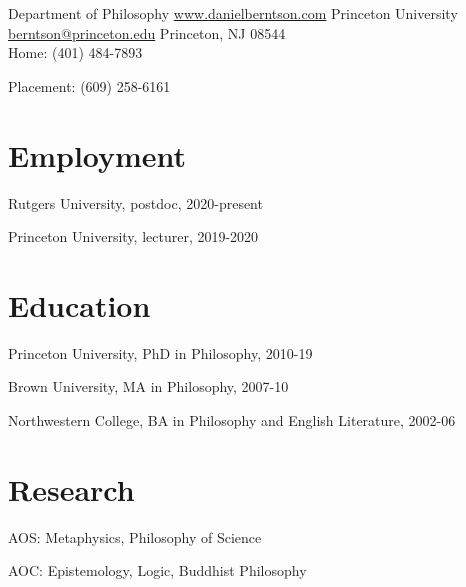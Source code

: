 \documentclass{cv_07152020}
\begin{document}
	

\vspace{20pt}
\noindent Department of Philosophy	\hfill \href{http://www.danielberntson.com}{www.danielberntson.com}\newline
\noindent Princeton University	\hfill \href{berntson@princeton.edu}{berntson@princeton.edu} \newline
\noindent Princeton, NJ 08544 \hfill  \newline
\\
\noindent Home: (401) 484-7893 \par
\noindent Placement: (609) 258-6161 \par


\section*{Employment}
\medskip
\begin{etaremune}
\item[] Rutgers University, postdoc, 2020-present
\item[] Princeton University, lecturer, 2019-2020
\end{etaremune}


\section*{Education}
\medskip
\begin{etaremune}
	\item[] Princeton University, PhD in Philosophy, 2010-19
	\item[] Brown University, MA in Philosophy, 2007-10
	\item[] Northwestern College, BA in Philosophy and English Literature, 2002-06
\end{etaremune}


\section*{Research}
\medskip
\begin{etaremune}
	\item[] AOS: Metaphysics, Philosophy of Science
	\item[] AOC: Epistemology, Logic, Buddhist Philosophy
\end{etaremune}
\end{document}
